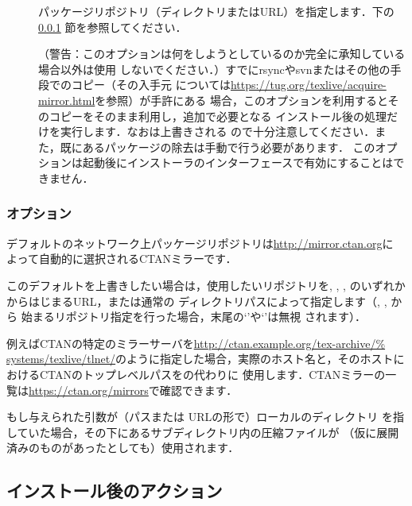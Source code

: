 \documentclass[uplatex,dvipdfmx,tombow]{jsarticle}
\begin{document}
\begin{description}
\item[]
パッケージリポジトリ（ディレクトリまたはURL）を指定します．下の\ref{sec:location}%
節を参照してください．

\item[]
（警告：このオプションは何をしようとしているのか完全に承知している場合以外は使用
しないでください．）すでにrsyncやsvnまたはその他の手段で\TL のコピー（その入手元
については\url{https://tug.org/texlive/acquire-mirror.html}を参照）が手許にある
場合，このオプションを利用するとそのコピーをそのまま利用し，追加で必要となる
インストール後の処理だけを実行します．なおは上書きされる
ので十分注意してください．また，既にあるパッケージの除去は手動で行う必要があります．
このオプションは起動後にインストーラのインターフェースで有効にすることはできません．
\end{description}

\subsubsection{オプション}
\label{sec:location}

デフォルトのネットワーク上パッケージリポジトリは\url{http://mirror.ctan.org}に
よって自動的に選択されるCTANミラーです．

このデフォルトを上書きしたい場合は，使用したいリポジトリを, , , のいずれかからはじまるURL，または通常の
ディレクトリパスによって指定します（, , から
始まるリポジトリ指定を行った場合，末尾の`\code{/}'や`'は無視
されます）．

例えばCTANの特定のミラーサーバを\url{http://ctan.example.org/tex-archive/%
systems/texlive/tlnet/}のように指定した場合，実際のホスト名と，そのホストに
おけるCTANのトップレベルパスをの代わりに
使用します．CTANミラーの一覧は\url{https://ctan.org/mirrors}で確認できます．

もし与えられた引数が（パスまたは URLの形で）ローカルのディレクトリ
を指していた場合，その下にあるサブディレクトリ内の圧縮ファイルが
（仮に展開済みのものがあったとしても）使用されます．

\subsection{インストール後のアクション}
\label{sec:postinstall}
\end{document}
